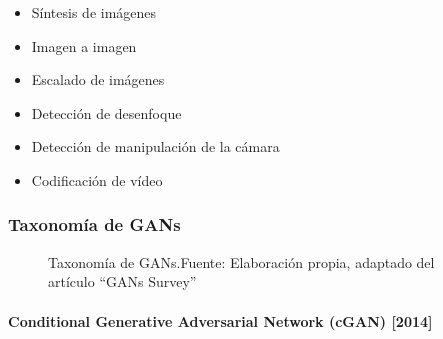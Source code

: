\begin{itemize}
    \item Síntesis de imágenes
    \item Imagen a imagen
    \item Escalado de imágenes
    \item Detección de desenfoque
    \item Detección de manipulación de la cámara
    \item Codificación de vídeo
\end{itemize}


\subsubsection*{Taxonomía de GANs}


\begin{figure}[H]
    \centering
    \centerline{}
    \caption{Taxonomía de GANs.\newline{}Fuente: Elaboración propia, adaptado del artículo ``GANs Survey'' \cite{GANSurvey_2021ZHENGWEIWANG}}
    \label{fig:gan-taxonomy}
\end{figure}


\paragraph*{Conditional Generative Adversarial Network (cGAN) [2014]}

